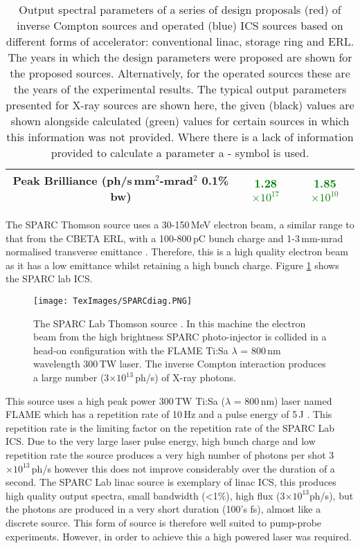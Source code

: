 \documentclass[11pt]{article}
\begin{document}
\begin{table}[H]
\begin{tabular}{|c||c|c|}
Peak Brilliance (ph/s\,mm$^{2}$-mrad$^{2}$ 0.1\% bw) & \textcolor{green}{1.28$\times 10^{17}$} & \textcolor{green}{1.85$\times 10^{10}$} \\
\hline
\end{tabular}
\caption{\label{tab:xrayICS} Output spectral parameters of a series of design proposals (red) of inverse Compton sources and operated (blue) ICS sources based on different forms of accelerator: conventional linac, storage ring and ERL. The years in which the design parameters were proposed are shown for the proposed sources. Alternatively, for the operated sources these are the years of the experimental results. The typical output parameters presented for X-ray sources are shown here, the given (black) values are shown alongside calculated (green) values for certain sources in which this information was not provided. Where there is a lack of information provided to calculate a parameter a - symbol is used.}
\end{table}    


The SPARC Thomson source uses a 30-150\,MeV electron beam, a similar range to that from the CBETA ERL, with a 100-800\,pC bunch charge and 1-3\,mm-mrad normalised transverse emittance \cite{SPARCcom}. Therefore, this is a high quality electron beam as it has a low emittance whilst retaining a high bunch charge. Figure \ref{fig:SPARCdiag} shows the SPARC lab ICS.

\begin{figure}[H]
\centering
\texttt{[image: TexImages/SPARCdiag.PNG]}
\caption{\label{fig:SPARCdiag} The SPARC Lab Thomson source \cite{SPARCcom}. In this machine the electron beam from the high brightness SPARC photo-injector is collided in a head-on configuration with the FLAME Ti:Sa $\lambda$ = 800\,nm wavelength 300\,TW laser. The inverse Compton interaction produces a large number (3$\times 10^{13}$\,ph/s) of X-ray photons.}
\end{figure}
 
This source uses a high peak power 300\,TW Ti:Sa ($\lambda$ = 800\,nm) laser named FLAME which has a repetition rate of 10\,Hz and a pulse energy of 5\,J \cite{SPARCcom}. This repetition rate is the limiting factor on the repetition rate of the SPARC Lab ICS. Due to the very large laser pulse energy, high bunch charge and low repetition rate  the source produces a very high number of photons per shot 3$\times 10^{13}$\,ph/s \cite{SPARC} however this does not improve considerably over the duration of a second. The SPARC Lab linac source is exemplary of linac ICS, this produces high quality output spectra, small bandwidth (<1\%), high flux (3$\times 10^{13}$ph/s), but the photons are produced in a very short duration (100's fs), almost like a discrete source. This form of source is therefore well suited to pump-probe experiments. However, in order to achieve this a high powered laser was required.
\end{document}
